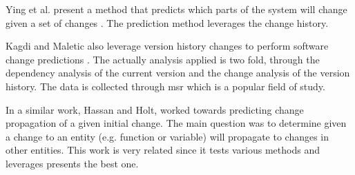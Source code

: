







Ying et al. present a method that predicts which parts of the system will change given a set of changes \cite{Ying2004}. The prediction method leverages the change history.

Kagdi and Maletic also leverage version history changes to perform software change predictions \cite{Kagdi2007}. The actually analysis applied is two fold, through the dependency analysis of the current version and the change analysis of the version history. The data is collected through \gls{msr} which is a popular field of study. 

In a similar work, Hassan and Holt, worked towards predicting change propagation of a given initial change. \cite{Hassan2004} The main question was to determine given a change to an entity (e.g. function or variable) will propagate to changes in other entities. This work is very related since it tests various methods and leverages presents the best one.

